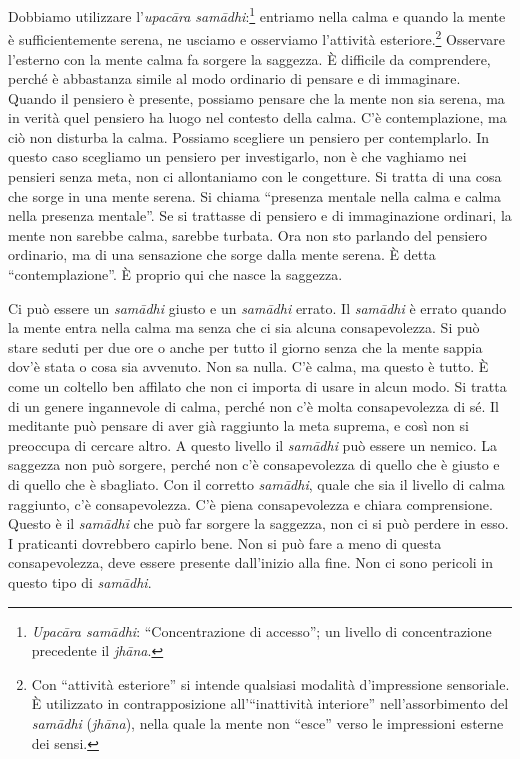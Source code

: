 Dobbiamo utilizzare l'\emph{upacāra samādhi}:\footnote{\emph{Upacāra samādhi}:
  ``Concentrazione di accesso''; un livello di concentrazione precedente
  il \emph{jhāna}.} entriamo nella calma e quando la mente è
sufficientemente serena, ne usciamo e osserviamo l'attività
esteriore.\footnote{Con ``attività esteriore'' si intende qualsiasi
  modalità d'impressione sensoriale. È utilizzato in contrapposizione
  all'``inattività interiore'' nell'assorbimento del \emph{samādhi}
  (\emph{jhāna}), nella quale la mente non ``esce'' verso le impressioni
  esterne dei sensi.} Osservare l'esterno con la mente calma fa sorgere
la saggezza. È difficile da comprendere, perché è abbastanza simile al
modo ordinario di pensare e di immaginare. Quando il pensiero è
presente, possiamo pensare che la mente non sia serena, ma in verità
quel pensiero ha luogo nel contesto della calma. C'è contemplazione, ma
ciò non disturba la calma. Possiamo scegliere un pensiero per
contemplarlo. In questo caso scegliamo un pensiero per investigarlo, non
è che vaghiamo nei pensieri senza meta, non ci allontaniamo con le
congetture. Si tratta di una cosa che sorge in una mente serena. Si
chiama ``presenza mentale nella calma e calma nella presenza mentale''.
Se si trattasse di pensiero e di immaginazione ordinari, la mente non
sarebbe calma, sarebbe turbata. Ora non sto parlando del pensiero
ordinario, ma di una sensazione che sorge dalla mente serena. È detta
``contemplazione''. È proprio qui che nasce la saggezza.

Ci può essere un \emph{samādhi} giusto e un \emph{samādhi} errato. Il
\emph{samādhi} è errato quando la mente entra nella calma ma senza che
ci sia alcuna consapevolezza. Si può stare seduti per due ore o anche
per tutto il giorno senza che la mente sappia dov'è stata o cosa sia
avvenuto. Non sa nulla. C'è calma, ma questo è tutto. È come un coltello
ben affilato che non ci importa di usare in alcun modo. Si tratta di un
genere ingannevole di calma, perché non c'è molta consapevolezza di sé.
Il meditante può pensare di aver già raggiunto la meta suprema, e così
non si preoccupa di cercare altro. A questo livello il \emph{samādhi}
può essere un nemico. La saggezza non può sorgere, perché non c'è
consapevolezza di quello che è giusto e di quello che è sbagliato. Con
il corretto \emph{samādhi}, quale che sia il livello di calma raggiunto,
c'è consapevolezza. C'è piena consapevolezza e chiara comprensione.
Questo è il \emph{samādhi} che può far sorgere la saggezza, non ci si
può perdere in esso. I praticanti dovrebbero capirlo bene. Non si può
fare a meno di questa consapevolezza, deve essere presente dall'inizio
alla fine. Non ci sono pericoli in questo tipo di \emph{samādhi}.

